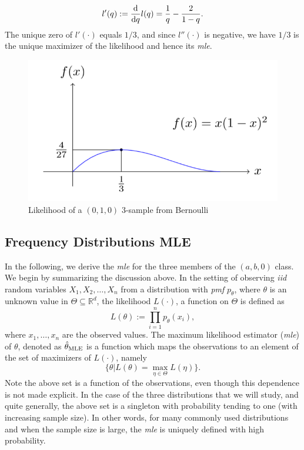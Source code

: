 \documentclass[]{book}
\theoremstyle{definition}
\theoremstyle{definition}
\theoremstyle{definition}
\theoremstyle{remark}
\begin{document}
\[
l'(q):=\frac{\rm d}{{\rm d}q}l(q)=\frac{1}{q}-\frac{2}{1-q}.
\] The unique zero of \(l'(\cdot)\) equals \(1/3\), and since
\(l''(\cdot)\) is negative, we have \(1/3\) is the unique maximizer of
the likelihood and hence its \emph{mle}.

\begin{figure}

{\centering \includegraphics[width=0.45\linewidth]{Figures/figure2.1} 

}

\caption{Likelihood of a $(0,1,0)$ $3$-sample from Bernoulli}\label{fig:berlik}
\end{figure}

\subsection{Frequency Distributions
MLE}\label{S:frequency-distributions-mle}

In the following, we derive the \emph{mle} for the three members of the
\((a,b,0)\) class. We begin by summarizing the discussion above. In the
setting of observing \emph{iid} random variables \(X_1,X_2,\ldots,X_n\)
from a distribution with \emph{pmf} \(p_\theta\), where \(\theta\) is an
unknown value in \(\Theta\subseteq \mathbb{R}^d\), the likelihood
\(L(\cdot)\), a function on \(\Theta\) is defined as \[
L(\theta):=\prod_{i=1}^n p_\theta(x_i),
\] where \(x_1,\ldots,x_n\) are the observed values. The maximum
likelihood estimator (\emph{mle}) of \(\theta\), denoted as
\(\hat{\theta}_{\rm MLE}\) is a function which maps the observations to
an element of the set of maximizers of \(L(\cdot)\), namely \[
\{\theta \vert L(\theta)=\max_{\eta\in\Theta}L(\eta)\}.
\] Note the above set is a function of the observations, even though
this dependence is not made explicit. In the case of the three
distributions that we will study, and quite generally, the above set is
a singleton with probability tending to one (with increasing sample
size). In other words, for many commonly used distributions and when the
sample size is large, the \emph{mle} is uniquely defined with high
probability.
\end{document}
